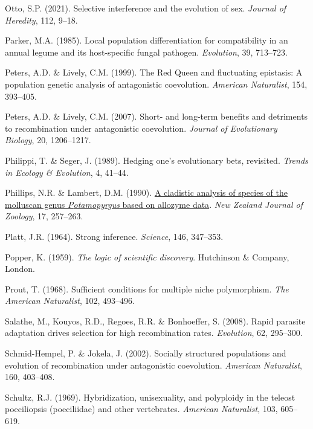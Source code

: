\documentclass[
  letterpaper,
]{book}
\newlength{\cslhangindent}
\newenvironment{CSLReferences}[2] %
 {\begin{list}{}{%
  \setlength{\itemindent}{0pt}
  \setlength{\leftmargin}{0pt}
  \setlength{\parsep}{0pt}
  \ifodd #1
   \setlength{\leftmargin}{\cslhangindent}
   \setlength{\itemindent}{-1\cslhangindent}
  \fi
  \setlength{\itemsep}{#2\baselineskip}}}
 {\end{list}}
\begin{document}
\begin{CSLReferences}{1}{0}
Otto, S.P. (2021). Selective interference and the evolution of sex.
\emph{Journal of Heredity}, 112, 9--18.

Parker, M.A. (1985). Local population differentiation for compatibility
in an annual legume and its host-specific fungal pathogen.
\emph{Evolution}, 39, 713--723.

Peters, A.D. \& Lively, C.M. (1999). The {Red Queen} and fluctuating
epistasis: A population genetic analysis of antagonistic coevolution.
\emph{American Naturalist}, 154, 393--405.

Peters, A.D. \& Lively, C.M. (2007). Short- and long-term benefits and
detriments to recombination under antagonistic coevolution.
\emph{Journal of Evolutionary Biology}, 20, 1206--1217.

Philippi, T. \& Seger, J. (1989). Hedging one's evolutionary bets,
revisited. \emph{Trends in Ecology \& Evolution}, 4, 41--44.

Phillips, N.R. \& Lambert, D.M. (1990).
\href{https://doi.org/10.1080/03014223.1990.10422600}{A cladistic
analysis of species of the molluscan genus \emph{{P}otamopyrgus} based
on allozyme data}. \emph{New Zealand Journal of Zoology}, 17, 257--263.

Platt, J.R. (1964). Strong inference. \emph{Science}, 146, 347--353.

Popper, K. (1959). \emph{The logic of scientific discovery}. Hutchinson
\& Company, London.

Prout, T. (1968). Sufficient conditions for multiple niche polymorphism.
\emph{The American Naturalist}, 102, 493--496.

Salathe, M., Kouyos, R.D., Regoes, R.R. \& Bonhoeffer, S. (2008). Rapid
parasite adaptation drives selection for high recombination rates.
\emph{Evolution}, 62, 295--300.

Schmid-Hempel, P. \& Jokela, J. (2002). Socially structured populations
and evolution of recombination under antagonistic coevolution.
\emph{American Naturalist}, 160, 403--408.

Schultz, R.J. (1969). Hybridization, unisexuality, and polyploidy in the
teleost poeciliopsis (poeciliidae) and other vertebrates. \emph{American
Naturalist}, 103, 605--619.


\end{CSLReferences}
\end{document}
